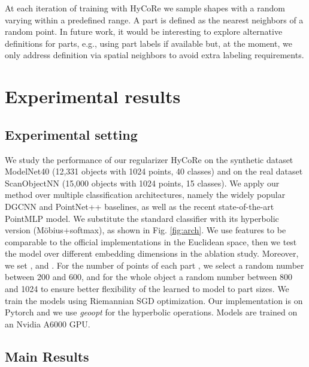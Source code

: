 \documentclass{article}
\begin{document}
At each iteration of training with HyCoRe we sample shapes with a random  varying within a predefined range. A part is defined as the  nearest neighbors of a random point. In future work, it would be interesting to explore alternative definitions for parts, e.g., using part labels if available but, at the moment, we only address definition via spatial neighbors to avoid extra labeling requirements.


\section{Experimental results}

\subsection{Experimental setting}


We study the performance of our regularizer HyCoRe on the synthetic dataset ModelNet40 \cite{wu20153d} (12,331 objects with 1024 points, 40 classes) and on the real dataset ScanObjectNN \cite{uy2019revisiting} (15,000 objects with 1024 points, 15 classes). 
We apply our method over multiple classification architectures, namely the widely popular DGCNN and PointNet++ baselines, as well as the recent state-of-the-art PointMLP model. We substitute the standard classifier with its hyperbolic version (M\"{o}bius+softmax), as shown in Fig. \ref{fig:arch}. We use  features to be comparable to the official implementations in the Euclidean space, then we test the model over different embedding dimensions in the ablation study.
Moreover, we set ,  and . For the number of points of each part , we select a random number between 200 and 600, and for the whole object a random number between 800 and 1024 to ensure better flexibility of the learned to model to part sizes. 
We train the models using Riemannian SGD optimization. Our implementation is on Pytorch and we use \textit{geoopt} \cite{geoopt2020kochurov} for the hyperbolic operations. Models are trained on an Nvidia A6000 GPU.


\subsection{Main Results}
\end{document}
